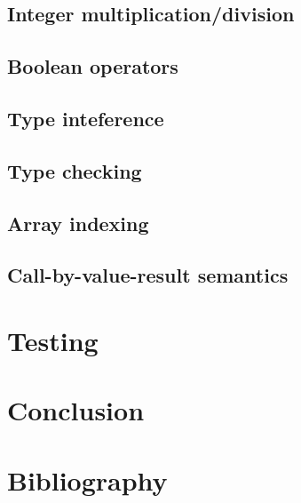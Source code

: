 \documentclass[10pt]{article}
\begin{document}
\subsection{Integer multiplication/division}
\subsection{Boolean operators}
\subsection{Type inteference}
\subsection{Type checking}
\subsection{Array indexing}
\subsection{Call-by-value-result semantics}

\section{Testing}

\section{Conclusion}

\section{Bibliography}

\end{document}
